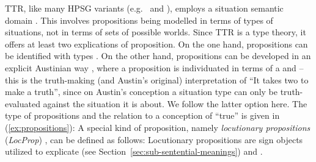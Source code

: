 \documentclass[output=paper,biblatex,babelshorthands,newtxmath,draftmode,colorlinks,citecolor=brown]{langscibook}
\begin{document}
TTR, like many HPSG variants (e.g.\ \citealt{Pollard:Sag:1987} and \citealt{Pollard:Sag:1994}), employs a situation semantic domain \citep{Cooper:ms}.
%
This involves propositions being modelled in terms of types of situations, not in terms of sets of possible worlds.
%
Since TTR is a type theory, it offers at least two explications of proposition.
%
On the one hand, propositions can be identified with types \citep{Cooper:2005:b}.
%
On the other hand, propositions can be developed in an explicit Austinian way \citep{Austin:1950}, where a proposition is individuated in terms of a  and  \citep[]{Ginzburg:2011:a} -- this is the truth-making (and Austin's original) interpretation of \enquote{It takes two to make a truth}, since on Austin's conception a situation type can only be truth-evaluated against the situation it is about.
%
We follow the latter option here.
%
The type of propositions and the relation to a  conception of \enquote{true} \citep{Barwise:Perry:1983} is given in (\ref{ex:propositions}):
%
\ea \label{ex:propositions}
\ea 
{}
\ex 
{}
\z
\z
%
A special kind of proposition, namely \emph{locutionary propositions} (\emph{LocProp}) \citep[]{Ginzburg:2012}, can be defined as follows:
%
\ea \label{ex:locprop}
\z
%
Locutionary propositions are sign objects utilized to explicate  (see Section~\ref{sec:sub-sentential-meanings}) and . 
\end{document}
